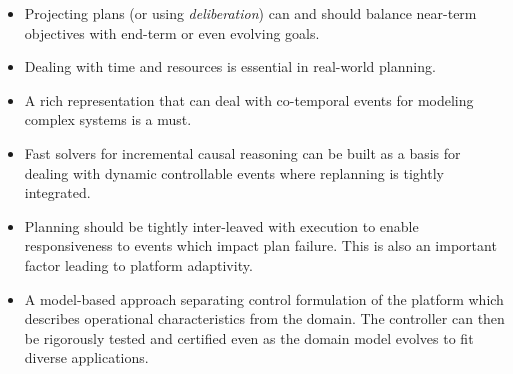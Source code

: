 \begin{itemize}

\item Projecting plans (or using \emph{deliberation}) can and should
  balance near-term objectives with end-term or even evolving goals.

\item Dealing with time and resources is essential in real-world
  planning.

\item A rich representation that can deal with co-temporal events for
  modeling complex systems is a must.

\item Fast solvers for incremental causal reasoning can be built as a
  basis for dealing with dynamic controllable events where replanning
  is tightly integrated.

\item Planning should be tightly inter-leaved with execution to enable
  responsiveness to events which impact plan failure. This is also an
  important factor leading to platform adaptivity.

\item A model-based approach separating control formulation of the
  platform which describes operational characteristics from the
  domain. The controller can then be rigorously tested and certified
  even as the domain model evolves to fit diverse applications.

\end{itemize}

